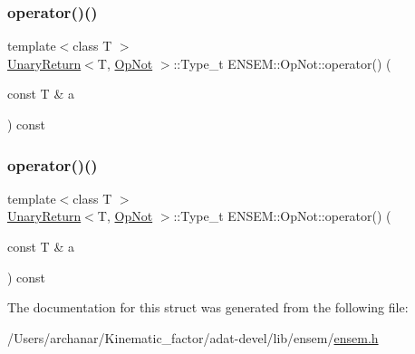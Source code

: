 \mbox{\label{structENSEM_1_1OpNot_a0e48693c476abfbda4c8abafefe17ad9}} 
\subsubsection{\texorpdfstring{operator()()}{operator()()}\hspace{0.1cm}{\footnotesize\ttfamily [2/3]}}
{\footnotesize\ttfamily template$<$class T $>$ \\
\mbox{\hyperlink{structENSEM_1_1UnaryReturn}{Unary\+Return}}$<$T, \mbox{\hyperlink{structENSEM_1_1OpNot}{Op\+Not}} $>$\+::Type\+\_\+t E\+N\+S\+E\+M\+::\+Op\+Not\+::operator() (\begin{DoxyParamCaption}\item[{const T \&}]{a }\end{DoxyParamCaption}) const\hspace{0.3cm}{\ttfamily [inline]}}

\mbox{\label{structENSEM_1_1OpNot_a0e48693c476abfbda4c8abafefe17ad9}} 
\subsubsection{\texorpdfstring{operator()()}{operator()()}\hspace{0.1cm}{\footnotesize\ttfamily [3/3]}}
{\footnotesize\ttfamily template$<$class T $>$ \\
\mbox{\hyperlink{structENSEM_1_1UnaryReturn}{Unary\+Return}}$<$T, \mbox{\hyperlink{structENSEM_1_1OpNot}{Op\+Not}} $>$\+::Type\+\_\+t E\+N\+S\+E\+M\+::\+Op\+Not\+::operator() (\begin{DoxyParamCaption}\item[{const T \&}]{a }\end{DoxyParamCaption}) const\hspace{0.3cm}{\ttfamily [inline]}}



The documentation for this struct was generated from the following file\+:\begin{DoxyCompactItemize}
\item 
/\+Users/archanar/\+Kinematic\+\_\+factor/adat-\/devel/lib/ensem/\mbox{\hyperlink{adat-devel_2lib_2ensem_2ensem_8h}{ensem.\+h}}\end{DoxyCompactItemize}
